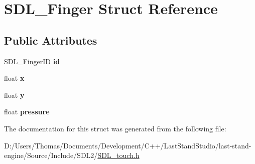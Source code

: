 \hypertarget{structSDL__Finger}{}\section{S\+D\+L\+\_\+\+Finger Struct Reference}
\label{structSDL__Finger}
\subsection*{Public Attributes}
\begin{DoxyCompactItemize}
\item 
\hypertarget{structSDL__Finger_a3cec630146eeec5bd6299a9387a6f16a}{}S\+D\+L\+\_\+\+Finger\+I\+D {\bfseries id}\label{structSDL__Finger_a3cec630146eeec5bd6299a9387a6f16a}

\item 
\hypertarget{structSDL__Finger_ab91dfbd03c3215560457fef44e1c7755}{}float {\bfseries x}\label{structSDL__Finger_ab91dfbd03c3215560457fef44e1c7755}

\item 
\hypertarget{structSDL__Finger_a0a2c7a06ae641940111e03801c672cf9}{}float {\bfseries y}\label{structSDL__Finger_a0a2c7a06ae641940111e03801c672cf9}

\item 
\hypertarget{structSDL__Finger_a0ecb50c7fd699d59899ac60c941bdee6}{}float {\bfseries pressure}\label{structSDL__Finger_a0ecb50c7fd699d59899ac60c941bdee6}

\end{DoxyCompactItemize}


The documentation for this struct was generated from the following file\+:\begin{DoxyCompactItemize}
\item 
D\+:/\+Users/\+Thomas/\+Documents/\+Development/\+C++/\+Last\+Stand\+Studio/last-\/stand-\/engine/\+Source/\+Include/\+S\+D\+L2/\hyperlink{SDL__touch_8h}{S\+D\+L\+\_\+touch.\+h}\end{DoxyCompactItemize}
